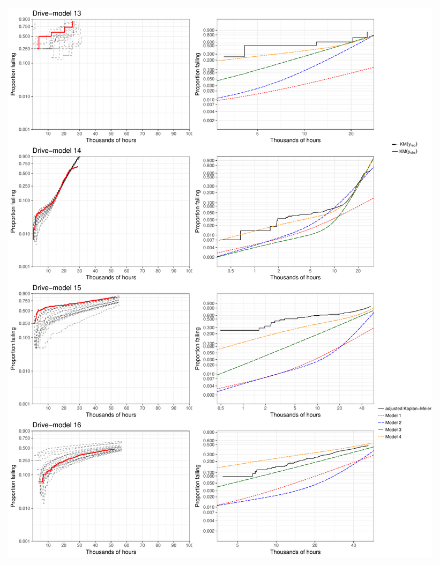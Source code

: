 \documentclass[12pt]{article}
\begin{document}
\begin{figure}[H]
\includegraphics[width=\textwidth]{ppcheck-v3-4.pdf}
\end{figure}
\end{document}
